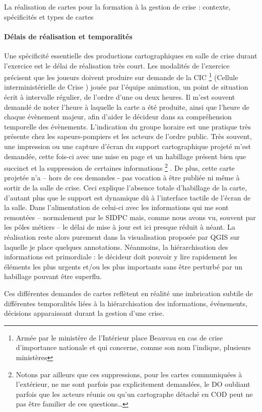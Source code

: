 \documentclass[10pt,a4paper]{report} %
\begin{document}
\begin{part}{La réalisation de cartes pour la formation à la gestion de crise : contexte, spécificités et types de cartes}
\paragraph{Délais de réalisation et temporalités}
Une spécificité essentielle des productions cartographiques en salle de crise durant l’exercice est le délai de réalisation très court. Les modalités de l’exercice précisent que les joueurs doivent produire sur demande de la CIC \footnote{Armée par le ministère de l’Intérieur place Beauvau en cas de crise d’importance nationale et qui concerne, comme son nom l’indique, plusieurs ministères} (Cellule interministérielle de Crise ) jouée par l’équipe animation, un point de situation écrit à intervalle régulier, de l’ordre d’une ou deux heures.  Il m’est souvent demandé de noter l’heure à laquelle la carte a été produite, ainsi que l’heure de chaque évènement majeur, afin d’aider le décideur dans sa compréhension temporelle des évènements. L’indication du groupe horaire est une pratique très présente chez les sapeurs-pompiers et les acteurs de l’ordre public.  Très souvent, une impression ou une capture d’écran du support cartographique projeté m’est demandée, cette fois-ci avec une mise en page et un habillage présent bien que succinct et la suppression de certaines informations \footnote{Notons par ailleurs que ces suppressions, pour les cartes communiquées à l'extérieur, ne me sont parfois pas explicitement demandées, le DO oubliant parfois que les acteurs réunis ou qu’un cartographe détaché en COD peut ne pas être familier de ces questions…} . De plus, cette carte projetée n'a – hors de ces demandes - pas vocation à être publiée ni même à sortir de la salle de crise. Ceci explique l’absence totale d’habillage de la carte, d’autant plus que le support est dynamique dû à l’interface tactile de l’écran de la salle. Dans l’alimentation de celui-ci avec les informations qui me sont remontées – normalement par le SIDPC mais, comme nous avons vu, souvent par les pôles métiers – le délai de mise à jour est ici presque réduit à néant. La réalisation reste alors purement dans la visualisation proposée par QGIS sur laquelle je place quelques annotations. Néanmoins, la hiérarchisation des informations est primordiale : le décideur doit pouvoir y lire rapidement les éléments les plus urgents et/ou les plus importants sans être perturbé par un habillage pouvant être superflu. 

Ces différentes demandes de cartes reflètent en réalité une imbrication subtile de différentes temporalités liées à la hiérarchisation des informations, événements, décisions apparaissant durant la gestion d’une crise. 


\end{part}
\end{document}
